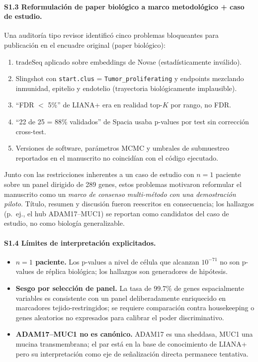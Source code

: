 \documentclass[12pt,a4paper]{article}
\begin{document}
\paragraph{S1.3 Reformulación de paper biológico a marco metodológico + caso de estudio.}
Una auditoría tipo revisor identificó cinco problemas bloqueantes para publicación en el encuadre original (paper biológico):
\begin{enumerate}
    \item tradeSeq aplicado sobre embeddings de Novae (estadísticamente inválido).
    \item Slingshot con \texttt{start.clus} = \texttt{Tumor\_proliferating} y endpoints mezclando inmunidad, epitelio y endotelio (trayectoria biológicamente implausible).
    \item ``FDR $<$ 5\%'' de LIANA+ era en realidad top-$K$ por rango, no FDR.
    \item ``22 de 25 = 88\% validados'' de Spacia usaba p-values por test sin corrección cross-test.
    \item Versiones de software, parámetros MCMC y umbrales de submuestreo reportados en el manuscrito no coincidían con el código ejecutado.
\end{enumerate}
Junto con las restricciones inherentes a un caso de estudio con $n=1$ paciente sobre un panel dirigido de 289 genes, estos problemas motivaron reformular el manuscrito como un \textit{marco de consenso multi-método con una demostración piloto}. Título, resumen y discusión fueron reescritos en consecuencia; los hallazgos (p.\ ej., el hub ADAM17--MUC1) se reportan como candidatos del caso de estudio, no como biología generalizable.

\paragraph{S1.4 Límites de interpretación explicitados.}
\begin{itemize}
    \item \textbf{$n=1$ paciente.} Los p-values a nivel de célula que alcanzan $10^{-71}$ no son p-values de réplica biológica; los hallazgos son generadores de hipótesis.
    \item \textbf{Sesgo por selección de panel.} La tasa de 99.7\% de genes espacialmente variables es consistente con un panel deliberadamente enriquecido en marcadores tejido-restringidos; se requiere comparación contra housekeeping o genes aleatorios no expresados para calibrar el poder discriminativo.
    \item \textbf{ADAM17--MUC1 no es canónico.} ADAM17 es una sheddasa, MUC1 una mucina transmembrana; el par está en la base de conocimiento de LIANA+ pero su interpretación como eje de señalización directa permanece tentativa.
\end{itemize}
\end{document}
